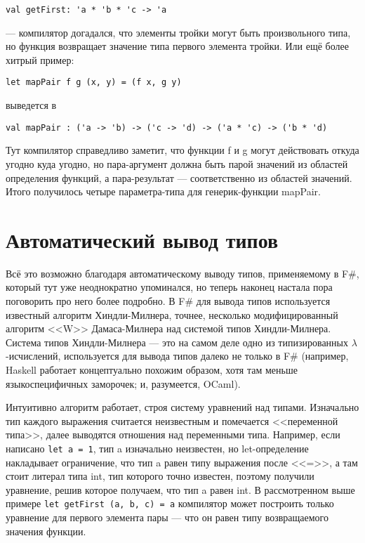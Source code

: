 \documentclass[a5paper]{article}
\begin{document}
\begin{verbatim}
val getFirst: 'a * 'b * 'c -> 'a
\end{verbatim}

--- компилятор догадался, что элементы тройки могут быть произвольного типа, но функция возвращает значение типа первого элемента тройки. Или ещё более хитрый пример:

\begin{verbatim}
let mapPair f g (x, y) = (f x, g y)
\end{verbatim}

выведется в 

\begin{verbatim}
val mapPair : ('a -> 'b) -> ('c -> 'd) -> ('a * 'c) -> ('b * 'd)
\end{verbatim}

Тут компилятор справедливо заметит, что функции f и g могут действовать откуда угодно куда угодно, но пара-аргумент должна быть парой значений из областей определения функций, а пара-результат --- соответственно из областей значений. Итого получилось четыре параметра-типа для генерик-функции mapPair.

\section{Автоматический вывод типов}

Всё это возможно благодаря автоматическому выводу типов, применяемому в F\#, который тут уже неоднократно упоминался, но теперь наконец настала пора поговорить про него более подробно. В F\# для вывода типов используется известный алгоритм Хиндли-Милнера, точнее, несколько модифицированный алгоритм <<W>> Дамаса-Милнера над системой типов Хиндли-Милнера. Система типов Хиндли-Милнера --- это на самом деле одно из типизированных $\lambda$-исчислений, используется для вывода типов далеко не только в F\# (например, Haskell работает концептуально похожим образом, хотя там меньше языкоспецифичных заморочек; и, разумеется, OCaml).

Интуитивно алгоритм работает, строя систему уравнений над типами. Изначально тип каждого выражения считается неизвестным и помечается <<переменной типа>>, далее выводятся отношения над переменными типа. Например, если написано \texttt{let a = 1}, тип a изначально неизвестен, но let-определение накладывает ограничение, что тип a равен типу выражения после <<=>>, а там стоит литерал типа int, тип которого точно известен, поэтому получили уравнение, решив которое получаем, что тип a равен int. В рассмотренном выше примере \texttt{let getFirst (a, b, c) = a} компилятор может построить только уравнение для первого элемента пары --- что он равен типу возвращаемого значения функции. 
\end{document}
